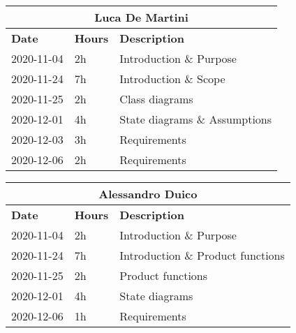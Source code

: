 
\begin{table}[H]
    \centering
    \begin{tabular}{|l|l|l|}
        \multicolumn{3}{c}{\textbf{Luca De Martini}}\\
        \hline
        \textbf{Date} & \textbf{Hours} & \textbf{Description}    \\\hline
        2020-11-04    & 2h             & Introduction \& Purpose \\\hline
        2020-11-24    & 7h             & Introduction \& Scope \\\hline
        2020-11-25    & 2h             & Class diagrams \\\hline
        2020-12-01    & 4h             & State diagrams \& Assumptions \\\hline
        2020-12-03    & 3h             & Requirements \\\hline
        2020-12-06    & 2h             & Requirements \\\hline
    \end{tabular}
\end{table}
\begin{table}[H]
    \centering
    \begin{tabular}{|l|l|l|}
        \multicolumn{3}{c}{\textbf{Alessandro Duico}}\\
        \hline
        \textbf{Date} & \textbf{Hours} & \textbf{Description}    \\\hline
        2020-11-04    & 2h             & Introduction \& Purpose \\\hline
        2020-11-24    & 7h             & Introduction \& Product functions \\\hline
        2020-11-25    & 2h             & Product functions \\\hline
        2020-12-01    & 4h             & State diagrams \\\hline
        2020-12-06    & 1h             & Requirements \\\hline
    \end{tabular}
\end{table}